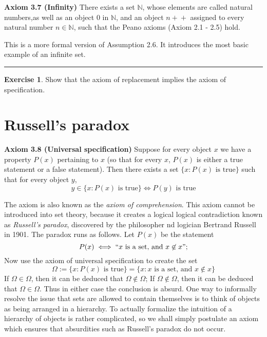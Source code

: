 \documentclass[
]{book}
\theoremstyle{definition}
\theoremstyle{definition}
\theoremstyle{definition}
\newtheorem{exercise}{Exercise}[chapter]
\theoremstyle{definition}
\theoremstyle{remark}
\begin{document}
\textbf{Axiom 3.7 (Infinity)} There exists a set \(\mathbb{N}\), whose elements are called natural numbers,as well as an object \(0\) in \(\mathbb{N}\), and an object \(n+\!\!+\) assigned to every natural number \(n \in \mathbb{N}\), such that the Peano axioms (Axiom 2.1 - 2.5) hold.

This is a more formal version of Assumption 2.6. It introduces the most basic example of an infinite set.

\begin{center}\rule{0.5\linewidth}{0.5pt}\end{center}

\begin{exercise}
Show that the axiom of replacement implies the axiom of specification.
\end{exercise}

\section{Russell's paradox}\label{russells-paradox}

\textbf{Axiom 3.8 (Universal specification)} Suppose for every object \(x\) we have a property \(P(x)\) pertaining to \(x\) (so that for every \(x\), \(P(x)\) is either a true statement or a false statement). Then there exists a set \(\{x:P(x) \text{ is true}\}\) such that for every object \(y\),
\[
y \in \{x:P(x) \text{ is true}\} \iff P(y) \text{ is true}
\]

The axiom is also known as the \emph{axiom of comprehension}. This axiom cannot be introduced into set theory, because it creates a logical logical contradiction known as \emph{Russell's paradox}, discovered by the philosopher nd logician Bertrand Russell in 1901. The paradox runs as follows. Let \(P(x)\) be the statement
\[
P(x) \iff ``x \text{ is a set, and }x\not \in x \text{''};
\]
Now use the axiom of universal specification to create the set
\[
\Omega := \{x:P(x) \text{ is true}\} = \{x:x \text{ is a set, and }x\not \in x\}
\]
If \(\Omega \in \Omega\), then it can be deduced that \(\Omega \not \in \Omega\); If \(\Omega \not\in \Omega\), then it can be deduced that \(\Omega \in \Omega\). Thus in either case the conclusion is absurd. One way to informally resolve the issue that sets are allowed to contain themselves is to think of objects as being arranged in a hierarchy. To actually formalize the intuition of a hierarchy of objects is rather complicated, so we shall simply postulate an axiom which ensures that absurdities such as Russell's paradox do not occur.
\end{document}
